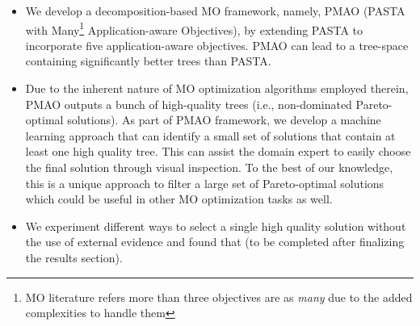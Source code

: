 \begin{itemize}
	\item We develop a decomposition-based MO framework, namely, PMAO (PASTA with Many\footnote{ MO literature refers more than three objectives are as \textit{many}\cite{li2015many} due to the added complexities to handle them} Application-aware Objectives), by extending PASTA to incorporate five application-aware objectives. PMAO can lead to a tree-space containing significantly better trees than PASTA. 

	\item Due to the inherent nature of MO optimization algorithms employed therein, PMAO outputs a bunch of high-quality trees (i.e., non-dominated Pareto-optimal solutions). As part of PMAO framework, we develop a machine learning approach that can identify a small set of solutions that contain at least one high quality tree. This can assist the domain expert to easily choose the final solution through visual inspection. To the best of our knowledge, this is a unique approach to filter a large set of Pareto-optimal solutions which could be useful in other MO optimization tasks as well. 
	
	\item We experiment different ways to select a single high quality solution without the use of external evidence and found that (to be completed after finalizing the results section).

	
\end{itemize}

